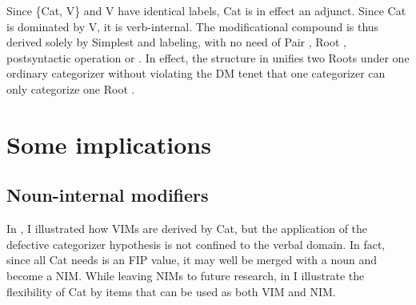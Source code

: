 \documentclass[output=paper]{langsci/langscibook}
\begin{document}
Since \{Cat\textsubscript{\textsurd}, V\textsubscript{\textsurd}\} and
V\textsubscript{\textsurd} have identical labels, Cat\textsubscript{\textsurd}
is in effect an adjunct. Since Cat\textsubscript{\textsurd} is dominated by V,
it is verb-internal. The modificational compound is thus derived solely by Simplest  and labeling, with no need of Pair , Root , postsyntactic operation or . In effect, the structure in  unifies two Roots under one ordinary categorizer without violating the \gls{DM} tenet that one categorizer can only categorize one Root \citep[cf.][]{Embick2010}.

\section{Some implications}\label{sec5}

\subsection{Noun-internal modifiers}\label{sec5.1}

In , I illustrated how \glspl{VIM} are derived by Cat, but the
application of the defective categorizer hypothesis is not confined to the
verbal domain. In fact, since all Cat\textsubscript{\textsurd} needs is an
\gls{FIP} value, it may well be merged with a noun and become a \gls{NIM}.
While leaving \glspl{NIM} to future research, in  I illustrate the
flexibility of Cat by items that can be used as both \gls{VIM} and NIM.
\end{document}
